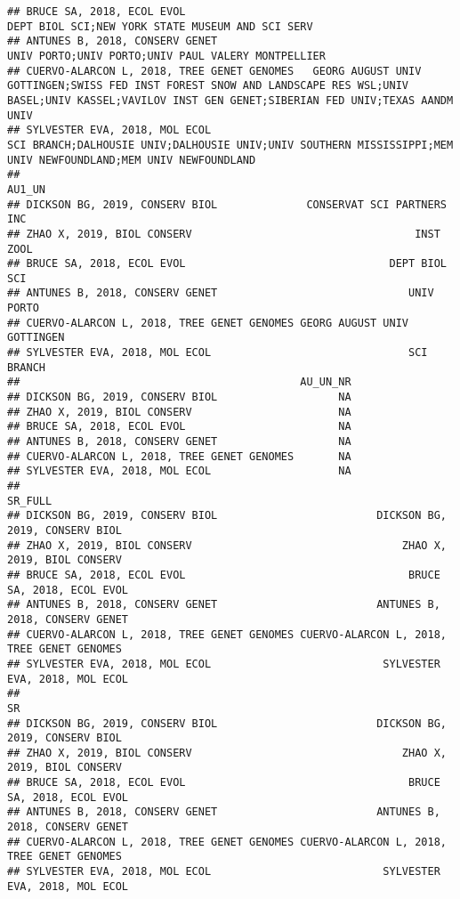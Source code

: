\documentclass[]{article}
\begin{document}
\begin{verbatim}
## BRUCE SA, 2018, ECOL EVOL                                                                                                                                 DEPT BIOL SCI;NEW YORK STATE MUSEUM AND SCI SERV
## ANTUNES B, 2018, CONSERV GENET                                                                                                                          UNIV PORTO;UNIV PORTO;UNIV PAUL VALERY MONTPELLIER
## CUERVO-ALARCON L, 2018, TREE GENET GENOMES   GEORG AUGUST UNIV GOTTINGEN;SWISS FED INST FOREST SNOW AND LANDSCAPE RES WSL;UNIV BASEL;UNIV KASSEL;VAVILOV INST GEN GENET;SIBERIAN FED UNIV;TEXAS AANDM UNIV
## SYLVESTER EVA, 2018, MOL ECOL                                                               SCI BRANCH;DALHOUSIE UNIV;DALHOUSIE UNIV;UNIV SOUTHERN MISSISSIPPI;MEM UNIV NEWFOUNDLAND;MEM UNIV NEWFOUNDLAND
##                                                                 AU1_UN
## DICKSON BG, 2019, CONSERV BIOL              CONSERVAT SCI PARTNERS INC
## ZHAO X, 2019, BIOL CONSERV                                   INST ZOOL
## BRUCE SA, 2018, ECOL EVOL                                DEPT BIOL SCI
## ANTUNES B, 2018, CONSERV GENET                              UNIV PORTO
## CUERVO-ALARCON L, 2018, TREE GENET GENOMES GEORG AUGUST UNIV GOTTINGEN
## SYLVESTER EVA, 2018, MOL ECOL                               SCI BRANCH
##                                            AU_UN_NR
## DICKSON BG, 2019, CONSERV BIOL                   NA
## ZHAO X, 2019, BIOL CONSERV                       NA
## BRUCE SA, 2018, ECOL EVOL                        NA
## ANTUNES B, 2018, CONSERV GENET                   NA
## CUERVO-ALARCON L, 2018, TREE GENET GENOMES       NA
## SYLVESTER EVA, 2018, MOL ECOL                    NA
##                                                                               SR_FULL
## DICKSON BG, 2019, CONSERV BIOL                         DICKSON BG, 2019, CONSERV BIOL
## ZHAO X, 2019, BIOL CONSERV                                 ZHAO X, 2019, BIOL CONSERV
## BRUCE SA, 2018, ECOL EVOL                                   BRUCE SA, 2018, ECOL EVOL
## ANTUNES B, 2018, CONSERV GENET                         ANTUNES B, 2018, CONSERV GENET
## CUERVO-ALARCON L, 2018, TREE GENET GENOMES CUERVO-ALARCON L, 2018, TREE GENET GENOMES
## SYLVESTER EVA, 2018, MOL ECOL                           SYLVESTER EVA, 2018, MOL ECOL
##                                                                                    SR
## DICKSON BG, 2019, CONSERV BIOL                         DICKSON BG, 2019, CONSERV BIOL
## ZHAO X, 2019, BIOL CONSERV                                 ZHAO X, 2019, BIOL CONSERV
## BRUCE SA, 2018, ECOL EVOL                                   BRUCE SA, 2018, ECOL EVOL
## ANTUNES B, 2018, CONSERV GENET                         ANTUNES B, 2018, CONSERV GENET
## CUERVO-ALARCON L, 2018, TREE GENET GENOMES CUERVO-ALARCON L, 2018, TREE GENET GENOMES
## SYLVESTER EVA, 2018, MOL ECOL                           SYLVESTER EVA, 2018, MOL ECOL
\end{verbatim}
\end{document}
